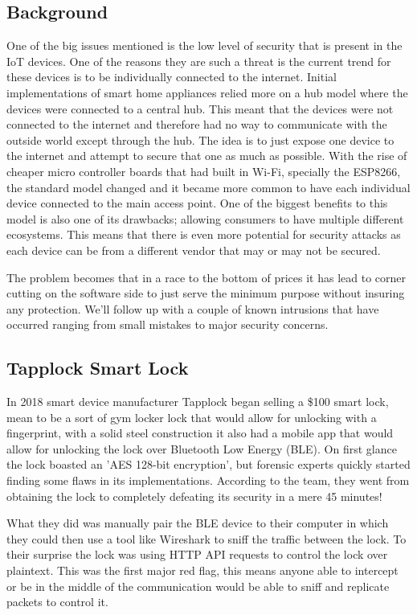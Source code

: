 \documentclass[acmlarge]{style/acmart}
\begin{document}
\subsection{Background}

One of the big issues mentioned is the low level of security that is present in the IoT devices. One of the reasons they are such a threat is the current trend for these devices is to be individually connected to the internet. Initial implementations of smart home appliances relied more on a hub model where the devices were connected to a central hub. This meant that the devices were not connected to the internet and therefore had no way to communicate with the outside world except through the hub. The idea is to just expose one device to the internet and attempt to secure that one as much as possible. With the rise of cheaper micro controller boards that had built in Wi-Fi, specially the ESP8266, the standard model changed and it became more common to have each individual device connected to the main access point. One of the biggest benefits to this model is also one of its drawbacks; allowing consumers to have multiple different ecosystems. This means that there is even more potential for security attacks as each device can be from a different vendor that may or may not be secured.  

The problem becomes that in a race to the bottom of prices it has lead to corner cutting on the software side to just serve the minimum purpose without insuring any protection. We'll follow up with a couple of known intrusions that have occurred ranging from small mistakes to major security concerns. 


\subsection{Tapplock Smart Lock}

In 2018 smart device manufacturer Tapplock began selling a \$100 smart lock, mean to be a sort of gym locker lock that would allow for unlocking with a fingerprint, with a solid steel construction it also had a mobile app that would allow for unlocking the lock over Bluetooth Low Energy (BLE).
On first glance the lock boasted an 'AES 128-bit encryption', but forensic experts quickly started finding some flaws in its implementations. According to the team, they went from obtaining the lock to completely defeating its security in a mere 45 minutes! \cite{Ken_2018}

What they did was manually pair the BLE device to their computer in which they could then use a tool like Wireshark to sniff the traffic between the lock. To their surprise the lock was using HTTP API requests to control the lock over plaintext. This was the first major red flag, this means anyone able to intercept or be in the middle of the communication would be able to sniff and replicate packets to control it. 
\end{document}

